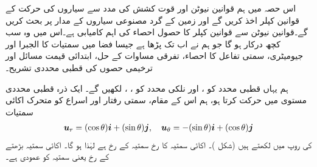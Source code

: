 اس حصہ میں ہم    قوانین نیوٹن اور قوت کشش  کی مدد سے سیاروں کی حرکت کے قوانین کپلر   اخذ کریں گے اور زمین کے گرد   مصنوعی سیاروں  کے مدار پر بحث کریں گے۔قوانین نیوٹن سے قوانین کپلر کا حصول احصاء  کی  اہم کامیابی  ہے۔اس میں وہ سب کچھ درکار ہو گا جو ہم نے اب تک پڑھا ہے جیسا فضا میں سمتیات کا الجبرا اور جیومیٹری، سمتی تفاعل  کا احصاء، تفرقی مساوات کے حل،  ابتدائی قیمت مسائل اور ترخیمی حصوں کی قطبی محددی  تشریح۔

ہم  یہاں  قطبی محدد  کو   ،  اور  نلکی محدد کو ، ،  لکھیں گے۔  ایک ذرہ قطبی محددی مستوی میں حرکت کرتا ہو، ہم اس کے مقام، سمتی رفتار اور اسراع کو متحرک اکائی سمتیات
\begin{align}\label{مساوات_سمتی_تفاعل_قطبی_روپ_الف}
{\ensuremath{{\boldsymbol{u}}}}_r=(\cos\theta){\boldsymbol{i}}+(\sin\theta){\boldsymbol{j}},\quad {\ensuremath{{\boldsymbol{u}}}}_{\theta}=-(\sin\theta){\boldsymbol{i}}+(\cos\theta){\boldsymbol{j}}
\end{align}
کی روپ میں لکھتے ہیں (شکل )۔ اکائی سمتیہ  کا رخ سمتیہ  کے رخ ہے لہٰذا  ہو گا۔ اکائی سمتیہ  بڑھتے   کے رخ یعنی   سمتیہ  کو  عمودی ہے۔

